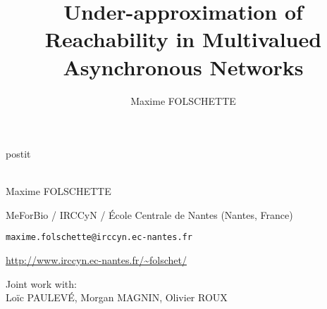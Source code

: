 \documentclass[fleqn,8pt,t]{beamer}
\date{\thedate}
\title[Under-approximation of Reachability in Multivalued Asynchronous Networks]{Under-approximation of Reachability in Multivalued Asynchronous Networks}
\author{Maxime FOLSCHETTE}
\newcommand{\ex}[1]{\textcolor{couleurex}{#1}}
\newcommand{\tcite}[1]{\textcolor{couleurcit}{[#1]}}
\newcommand{\tval}[1]{\textbf{#1}}
\begin{document}
\begin{frame}[plain,label=title]

\begin{center}
\vspace{1cm}
\begin{beamercolorbox}[sep=0.5em]{postit}
\centering
\Large
\textbf{%
{\normalsize\theconference{}}\\~\\%
\inserttitle
}
\end{beamercolorbox}

\par
\medskip
\bigskip
\normalsize
Maxime FOLSCHETTE

\medskip
\footnotesize
MeForBio / IRCCyN / École Centrale de Nantes (Nantes, France)

\texttt{maxime.folschette@irccyn.ec-nantes.fr}

\url{http://www.irccyn.ec-nantes.fr/~folschet/}

\bigskip
Joint work with:
\\
\normalsize
Loïc PAULEVÉ, Morgan MAGNIN, Olivier ROUX
\end{center}

\end{frame}





\newcommand{\citeegfra}{\quad\tval{\ex{egfr20}}: \tcite{Epidermal Growth Factor Receptor, by Özgür Sahin \textit{et al.}}}
\newcommand{\citeegfrb}{\quad\tval{\ex{egfr104}}: \tcite{Epidermal Growth Factor Receptor, by Regina Samaga \textit{et al.}}}
\newcommand{\citetcrsiga}{\quad\tval{\ex{tcrsig40}}: \tcite{T-Cell Receptor Signaling, by Steffen Klamt \textit{et al.}}}
\newcommand{\citetcrsigb}{\quad\tval{\ex{tcrsig94}}: \tcite{T-Cell Receptor Signaling, by Julio Saez-Rodriguez \textit{et al.}}}

\newcommand{\citemodels}{\bigskip\citeegfra\\\citeegfrb\\\citetcrsiga\\\citetcrsigb}

\newcommand{\citepmrtcsb}{Paulevé, Magnin, Roux in Transactions on Computational Systems Biology, 2011}
\newcommand{\citepmrmscs}{Paulevé, Magnin, Roux in Mathematical Structures in Computer Science, 2012}
\newcommand{\citefpimrcmsb}{{\scriptsize Folschette, Paulevé, Inoue, Magnin, Roux in Computational Methods in Systems Biology, 2012}}
\newcommand{\citedejong}{de Jong in Journal of Computational Biology, 2002}
\end{document}
